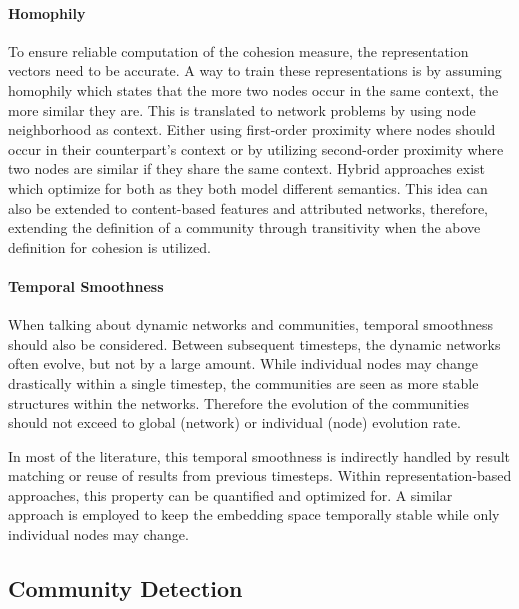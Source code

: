 \documentclass[
acmsmall,
nonacm,
screen,
acmthm]{acmart}
\begin{document}
\hypertarget{homophily}{%
\paragraph{Homophily}\label{homophily}}

To ensure reliable computation of the cohesion measure, the
representation vectors need to be accurate. A way to train these
representations is by assuming homophily which states that the more two
nodes occur in the same context, the more similar they are. This is
translated to network problems by using node neighborhood as context.
Either using first-order proximity where nodes should occur in their
counterpart's context or by utilizing second-order proximity where two
nodes are similar if they share the same context. Hybrid approaches
exist which optimize for both as they both model different semantics.
This idea can also be extended to content-based features and attributed
networks, therefore, extending the definition of a community through
transitivity when the above definition for cohesion is utilized.

\hypertarget{temporal-smoothness}{%
\paragraph{Temporal Smoothness}\label{temporal-smoothness}}

When talking about dynamic networks and communities, temporal smoothness
should also be considered. Between subsequent timesteps, the dynamic
networks often evolve, but not by a large amount. While individual nodes
may change drastically within a single timestep, the communities are
seen as more stable structures within the networks. Therefore the
evolution of the communities should not exceed to global (network) or
individual (node) evolution rate.

In most of the literature, this temporal smoothness is indirectly
handled by result matching or reuse of results from previous timesteps.
Within representation-based approaches, this property can be quantified
and optimized for. A similar approach is employed to keep the embedding
space temporally stable while only individual nodes may change.

\hypertarget{community-detection-2}{%
\subsection{Community Detection}\label{community-detection-2}}
\end{document}
